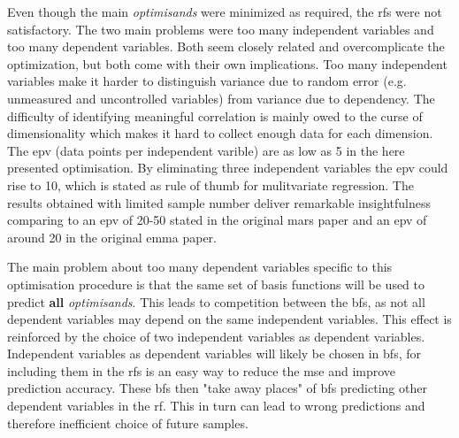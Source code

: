 Even though the main \textit{optimisands} were minimized as required, the \gls{rf}s were not satisfactory. 
The two main problems were too many independent variables and too many dependent variables. 
Both seem closely related and overcomplicate the optimization, but both come with their own implications. 
Too many independent variables make it harder to distinguish variance due to random error (e.g. unmeasured and uncontrolled variables) from variance due to dependency. %
The difficulty of identifying meaningful correlation is mainly owed to the curse of dimensionality\cite{friedman1988fitting} which makes it hard to collect enough data for each dimension. 
%
The \gls{epv} (data points per independent varible) are as low as 5 in the here presented optimisation. %
By eliminating three independent variables the \gls{epv} could rise to 10, which is stated 
as rule of thumb for mulitvariate regression\cite{vittinghoff2007relaxing}. 
The results obtained with limited sample number deliver remarkable insightfulness %
comparing to an \gls{epv} of 20-50 stated in the original \gls{mars} paper\cite{friedman1991multivariate} 
and an \gls{epv} of around 20 in the original \gls{emma} paper\cite{villanova2010function}. 
%

The main problem about too many dependent variables specific to this optimisation procedure 
is that the same set of basis functions will be used to predict \textbf{all} \textit{optimisands}.
This leads to competition between the \gls{bf}s, as not all dependent variables may depend on the same independent variables. 
This effect is reinforced by the choice of two independent variables as dependent variables. %
Independent variables as dependent variables will likely be chosen in \gls{bf}s, 
for including them in the \gls{rf}s is an easy way to reduce the \gls{mse} and improve prediction accuracy.
\enlargethispage{\baselineskip}
These \gls{bf}s then "take away places" of \gls{bf}s predicting other dependent variables in the \gls{rf}. %
This in turn can lead to wrong predictions and therefore inefficient choice of future samples. 

